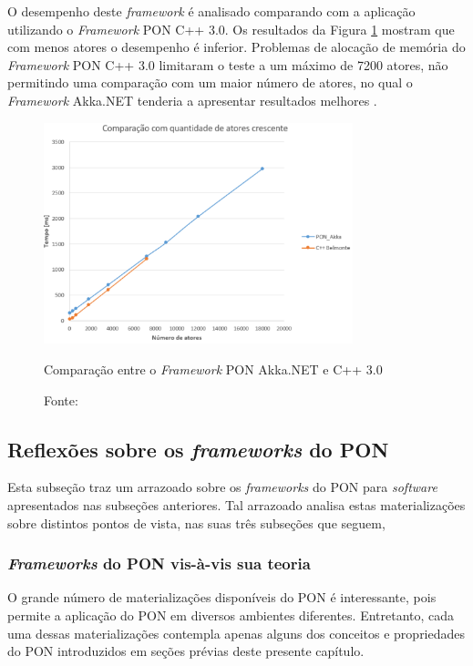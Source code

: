 O desempenho deste \textit{framework} é analisado comparando com a aplicação
utilizando o \textit{Framework} PON C++ 3.0. Os resultados da Figura
\ref{fig:result_akka} mostram que com menos atores o desempenho é inferior.
Problemas de alocação de memória do \textit{Framework} PON C++ 3.0 limitaram o
teste a um máximo de 7200 atores, não permitindo uma comparação com um maior
número de atores, no qual o \textit{Framework} Akka.NET tenderia a apresentar
resultados melhores \cite{martini_2019}.

\begin{figure}[!htb]
  \centering
  \includegraphics[width=0.8\textwidth]{../figures/result_akka.png}
  \smallskip
  \caption{Comparação entre o \textit{Framework} PON Akka.NET e C++ 3.0}
  \caption*{Fonte: }
  \label{fig:result_akka}
\end{figure}

\subsection{Reflexões sobre os \textit{frameworks} do PON}\label{sec:reflex}

Esta subseção traz um arrazoado sobre os \textit{frameworks} do PON para
\textit{software} apresentados nas subseções anteriores. Tal arrazoado analisa
estas materializações sobre distintos pontos de vista, nas suas três subseções
que seguem,

\subsubsection{\textit{Frameworks} do PON vis-à-vis sua teoria}

O grande número de materializações disponíveis do PON é interessante, pois
permite a aplicação do PON em diversos ambientes diferentes. Entretanto, cada
uma dessas materializações contempla apenas alguns dos conceitos e propriedades
do PON introduzidos em seções prévias deste presente capítulo.

